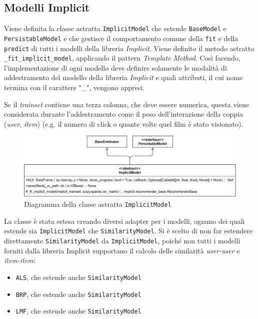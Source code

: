 \subsection{Modelli Implicit}

Viene definita la classe astratta \texttt{ImplicitModel} che estende \texttt{BaseModel} e \\ \texttt{PersistableModel} e che gestisce il comportamento comune della \texttt{fit} e della \texttt{predict} di tutti i modelli della libreria \textit{Implicit}. Viene definito il metodo astratto \texttt{\_fit\_implicit\_model}, applicando il pattern \textit{Template Method}. Così facendo, l'implementazione di ogni modello deve definire solamente le modalità di addestramento del modello della libreria \textit{Implicit} e quali attributi, il cui nome termina con il carattere "\_", vengono appresi.

Se il \textit{trainset} contiene una terza colonna, che deve essere numerica, questa viene considerata durante l'addestramento come il peso dell'interazione della coppia (\textit{user}, \textit{item}) (e.g. il numero di click o quante volte quel film è stato visionato). 

\begin{figure}[H]
    \centering
    \includegraphics[scale=0.15]{figures/UML/models/implicit_model.png}
    \caption{Diagramma della classe astratta \texttt{ImplicitModel}}
\end{figure}

La classe è stata estesa creando diversi adapter per i modelli, ognuno dei quali estende sia \texttt{ImplicitModel} che \texttt{SimilarityModel}. Si è scelto di non far estendere direttamente \texttt{SimilarityModel} da \texttt{ImplicitModel}, poiché non tutti i modelli forniti dalla libreria Implicit supportano il calcolo delle similarità \textit{user-user} e \textit{item-item}:

\begin{itemize}
    \item \texttt{ALS}, che estende anche \texttt{SimilarityModel}
    \item \texttt{BRP}, che estende anche \texttt{SimilarityModel}
    \item \texttt{LMF}, che estende anche \texttt{SimilarityModel}
\end{itemize}

